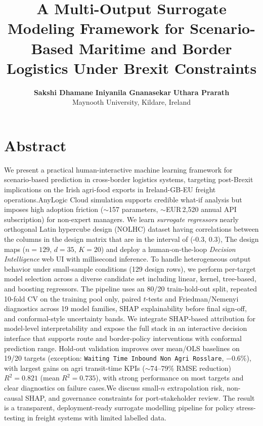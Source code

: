 \documentclass[12pt,twocolumn,a4paper]{article}
\title{A Multi-Output Surrogate Modeling Framework for Scenario-Based Maritime and Border Logistics Under Brexit Constraints}
\author{%
  \textbf{Sakshi Dhamane} \quad
  \textbf{Iniyanila Gnanasekar} \quad
  \textbf{Uthara Prarath}\\[4pt]
  \fontsize{11}{13}\selectfont
  Maynooth University, Kildare, Ireland \\[2pt]
}
\makeatletter
\theoremstyle{plain}
\theoremstyle{definition}
\theoremstyle{remark}
\renewcommand{\maketitle}{%
  \twocolumn[{%
    \vspace*{-0.5em}
    \hrule height 1pt
    \vskip 6pt
    {\centering\fontsize{16}{18}\bfseries\selectfont \@title \par}
    \vskip 6pt
    \hrule height 1pt
    \vskip 10pt
    {\centering\fontsize{12}{14}\selectfont \@author \par}
    \vskip 14pt
  }]%
}
\makeatother
\begin{document}

\maketitle
\thispagestyle{plain}

\section*{Abstract}
We present a practical human-interactive machine learning framework for scenario-based prediction in cross-border logistics systems, targeting post-Brexit implications on the Irish agri-food exports in Ireland-GB-EU freight operations.AnyLogic Cloud simulation supports credible what-if analysis but imposes high adoption friction (${\sim}$157 parameters, ${\sim}$EUR\,2{,}520 annual API subscription) for non-expert managers. We learn \emph{surrogate regressors}  nearly orthogonal Latin hypercube design (NOLHC) dataset having correlations between the columns in the design matrix that are in the interval of (-0.3, 0.3),  The design maps ($n{=}129$, $d{=}35$, $K{=}20$) and deploy a human-on-the-loop \emph{Decision Intelligence} web UI with millisecond inference. To handle heterogeneous output behavior under small-sample conditions (129 design rows), we perform per-target model selection across a diverse candidate set including linear, kernel, tree-based, and boosting regressors. The pipeline uses an 80/20 train-hold-out split, repeated 10-fold CV on the training pool only, paired $t$-tests and Friedman/Nemenyi diagnostics across 19 model families, SHAP explainability before final sign-off, and conformal-style uncertainty bands. We integrate SHAP-based attribution for model-level interpretability and expose the full stack in an interactive decision interface that supports route and border-policy interventions with conformal prediction range. Hold-out validation improves over mean/OLS baselines on 19/20 targets (exception: \texttt{Waiting Time Inbound Non Agri Rosslare}, $-0.6\%$), with largest gains on agri transit-time KPIs (${\sim}$74--79\% RMSE reduction)$R^2=0.821$ (mean $R^2=0.735$), with strong performance on most targets and clear diagnostics on failure cases.We discuss small-$n$ extrapolation risk, non-causal SHAP, and governance constraints for  port-stakeholder review. The result is a transparent, deployment-ready surrogate modelling pipeline for policy stress-testing in freight systems with limited labelled data.
\end{document}
